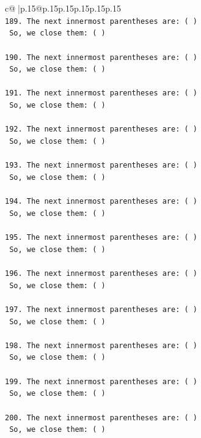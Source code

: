 \documentclass{article}
\begin{document}
{\begin{supertabular}{c@{$\;$}|p{.15\linewidth}@{}p{.15\linewidth}p{.15\linewidth}p{.15\linewidth}p{.15\linewidth}p{.15\linewidth}}
{{{\\ 
\texttt{189. The next innermost parentheses are: ( ) } \\
\texttt{    So, we close them: ( ) } \\
\\ 
\texttt{190. The next innermost parentheses are: ( ) } \\
\texttt{    So, we close them: ( ) } \\
\\ 
\texttt{191. The next innermost parentheses are: ( ) } \\
\texttt{    So, we close them: ( ) } \\
\\ 
\texttt{192. The next innermost parentheses are: ( ) } \\
\texttt{    So, we close them: ( ) } \\
\\ 
\texttt{193. The next innermost parentheses are: ( ) } \\
\texttt{    So, we close them: ( ) } \\
\\ 
\texttt{194. The next innermost parentheses are: ( ) } \\
\texttt{    So, we close them: ( ) } \\
\\ 
\texttt{195. The next innermost parentheses are: ( ) } \\
\texttt{    So, we close them: ( ) } \\
\\ 
\texttt{196. The next innermost parentheses are: ( ) } \\
\texttt{    So, we close them: ( ) } \\
\\ 
\texttt{197. The next innermost parentheses are: ( ) } \\
\texttt{    So, we close them: ( ) } \\
\\ 
\texttt{198. The next innermost parentheses are: ( ) } \\
\texttt{    So, we close them: ( ) } \\
\\ 
\texttt{199. The next innermost parentheses are: ( ) } \\
\texttt{    So, we close them: ( ) } \\
\\ 
\texttt{200. The next innermost parentheses are: ( ) } \\
\texttt{    So, we close them: ( ) } \\
}}}
\end{supertabular}}
\end{document}
